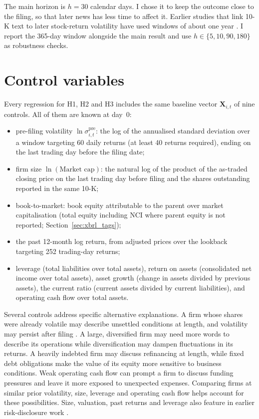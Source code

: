 The main horizon is $h = 30$ calendar days. I chose it to keep the outcome close to the filing,
so that later news has less time to affect it. Earlier studies that link 10-K
text to later stock-return volatility have used windows of about one year
\parencite{campbell2014, kogan2009, loughran2011}. I report the 365-day window
alongside the main result and use $h \in \{5, 10, 90, 180\}$ as robustness
checks.


\section{Control variables}
\label{sec:controls}

Every regression for H1, H2 and H3 includes the same baseline vector
$\mathbf{X}_{i,t}$ of nine controls. All of them are known at day~0:
\begin{itemize}
  \item pre-filing volatility $\ln\sigma^{\mathrm{pre}}_{i,t}$: the log of the
    annualised standard deviation over a window targeting 60 daily returns (at least 40 returns required), ending on the last
    trading day before the filing date;
  \item firm size $\ln(\text{Market cap})$: the natural log of the product of the as-traded closing price on the
    last trading day before filing and the shares outstanding reported in
    the same 10-K;
  \item book-to-market: book equity attributable to the parent over market
    capitalisation (total equity including NCI where parent equity is not
    reported; Section~\ref{sec:xbrl_tags});
  \item the past 12-month log return, from adjusted prices over the lookback targeting 252 trading-day returns;
  \item leverage (total liabilities over total assets), return on assets
    (consolidated net income over total assets), asset growth (change in assets divided by previous assets), the current
    ratio (current assets divided by current liabilities), and operating cash flow over total assets.
\end{itemize}
Several controls address specific alternative explanations. A firm whose shares were already volatile may describe unsettled conditions at length, and volatility may persist after filing \parencite{kogan2009}. A large, diversified firm may need more words to describe its operations while diversification may dampen fluctuations in its returns. A heavily indebted firm may discuss refinancing at length, while fixed debt obligations make the value of its equity more sensitive to business conditions. Weak operating cash flow can prompt a firm to discuss funding pressures and leave it more exposed to unexpected expenses. Comparing firms at similar prior volatility, size, leverage and operating cash flow helps account for these possibilities. Size, valuation, past returns and leverage also feature in earlier risk-disclosure work \parencite{campbell2014}.

